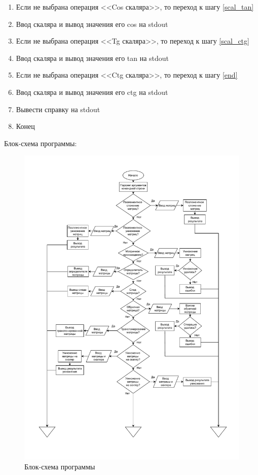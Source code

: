 \documentclass[a4paper,14pt]{extarticle}
\begin{document}
\begin{enumerate}
\item \label{scal_cos}
Если не выбрана операция <<Cos скаляра>>, то переход к шагу \ref{scal_tan}
\item Ввод скаляра и вывод значения его cos на stdout	
	
\item \label{scal_tan} 
Если не выбрана операция <<Tg скаляра>>, то переход к шагу \ref{scal_ctg}
\item Ввод скаляра и вывод значения его tan на stdout	
	
\item \label{scal_ctg}
Если не выбрана операция <<Ctg скаляра>>, то переход к шагу \ref{end}
\item Ввод скаляра и вывод значения его ctg на stdout 	
	
\item \label{end} Вывести справку на stdout
	
\item Конец 
\end{enumerate}
	
\newpage	
	
Блок-схема программы:	
\begin{figure}[H]
	\includegraphics[page=1, width=\textwidth]{include/block_scheme.pdf}
	\caption{Блок-схема программы}
\end{figure}
\end{document}
